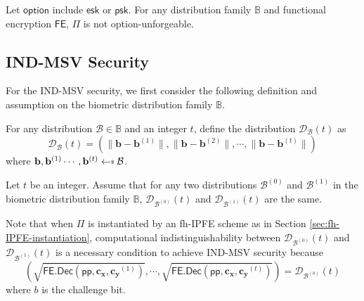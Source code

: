 \begin{theorem}

Let $\textsf{option}$ include $\textsf{esk}$ or $\textsf{psk}$. For any distribution family $\mathbb{B}$ and functional encryption $\textsf{FE}$, $\Pi$ is not \textsf{option}-unforgeable.

\end{theorem}




\subsection{IND-MSV Security}
\label{sec:security_analysis:fh-IPFE:IND-MSV}

For the IND-MSV security, we first consider the following definition and assumption on the biometric distribution family $\mathbb{B}$.

\begin{definition}
For any distribution $\mathcal{B} \in \mathbb{B}$ and an integer $t$, define the distribution $\mathcal{D}_\mathcal{B}(t)$ as
\[
	\mathcal{D}_\mathcal{B}(t) = \left( \| \mathbf{b} - \mathbf{b}^{(1)} \|, \| \mathbf{b} - \mathbf{b}^{(2)} \|, \cdots, \| \mathbf{b} - \mathbf{b}^{(t)} \| \right)
\]
where $\mathbf{b}, \mathbf{b}^{(1)} \cdots, \mathbf{b}^{(t)} \getsdollar \mathcal{B}$.

\end{definition}

\begin{assumption}
\label{assump:equal_distance}
Let $t$ be an integer. Assume that for any two distributions $\mathcal{B}^{(0)}$ and $\mathcal{B}^{(1)}$ in the biometric distribution family $\mathbb{B}$, $\mathcal{D}_{ \mathcal{B}^{(0)} }(t)$ and $\mathcal{D}_{ \mathcal{B}^{(1)} }(t)$ are the same. 

\end{assumption}

Note that when $\Pi$ is instantiated by an fh-IPFE scheme as in Section \ref{sec:fh-IPFE-instantiation}, computational indistinguishability between $\mathcal{D}_{ \mathcal{B}^{(0)} }(t)$ and $\mathcal{D}_{ \mathcal{B}^{(1)} }(t)$ is a necessary condition to achieve IND-MSV security because
\[
	\left( \sqrt{ \textsf{FE.Dec}(\textsf{pp}, \mathbf{c_x}, \mathbf{c_y}^{(1)}) }, \cdots, \sqrt{ \textsf{FE.Dec}(\textsf{pp}, \mathbf{c_x}, \mathbf{c_y}^{(t)}) } \right) = \mathcal{D}_{ \mathcal{B}^{(b)} }(t)
\]
where $b$ is the challenge bit.





